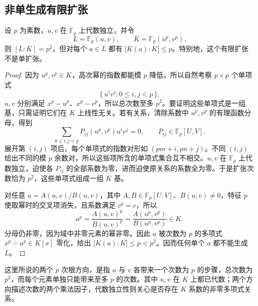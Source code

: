 \subsection{非单生成有限扩张}
\label{b1:subsec:1604:03}

\begin{proposition}\label{b1:prop:non-simple-finite-extension}
	设 \(p\) 为素数，\(u,v\) 在 \(\mathbb F_p\) 上代数独立，并令
	\[
		L=\mathbb F_p(u,v),\qquad K=\mathbb F_p(u^p,v^p).
	\]
	则 \([L:K]=p^2\)，但对每个 \(a\in L\) 都有 \(\bigl[K(a):K\bigr]\leq p\)。特别地，这个有限扩张不是单扩张。
\end{proposition}
\begin{proof}
	因为 \(u^p,v^p\in K\)，高次幂的指数都能模 \(p\) 降低，所以自然考察 \(p\times p\) 个单项式
	\[
		\{\,u^iv^j:0\le i,j<p\,\}.
	\]
	\(u,v\) 分别满足 \(x^p-u^p\)、\(x^p-v^p\)，所以总次数至多 \(p^2\)。要证明这些单项式是一组基，只需证明它们在 \(K\) 上线性无关。若有关系，清除系数中 \(u^p,v^p\) 的有理函数分母，得到
	\[
		\sum_{0\le i,j<p}P_{ij}(u^p,v^p)u^iv^j=0, \qquad P_{ij}\in\mathbb F_p[U,V].
	\]
	展开第 \((i,j)\) 项后，每个单项式的指数对形如 \((pm+i,pn+j)\)。不同 \((i,j)\) 给出不同的模 \(p\) 余数对，所以这些项所含的单项式集合互不相交。\(u,v\) 在 \(\mathbb F_p\) 上代数独立，迫使各 \(P_{ij}\) 的全部系数为零，进而迫使原关系的系数全为零。于是扩张次数恰为 \(p^2\)，这些单项式组成一组 \(K\) 基。

	对任意 \(a=A(u,v)/B(u,v)\)，其中 \(A,B\in\mathbb F_p[U,V]\)、\(B(u,v)\ne0\)，特征 \(p\) 使取幂时的交叉项消失，且系数满足 \(c^p=c\)，所以
	\[
		a^p=\frac{A(u,v)^p}{B(u,v)^p} =\frac{A(u^p,v^p)}{B(u^p,v^p)}\in K.
	\]
	分母仍非零，因为域中非零元素的幂非零。因此 \(a\) 被次数为 \(p\) 的多项式 \(x^p-a^p\in K[x]\) 零化，给出 \(\bigl[K(a):K\bigr]\leq p<p^2\)。因而任何单个 \(a\) 都不能生成 \(L\)。
\end{proof}
这里所说的两个 \(p\) 次根方向，是指 \(u\) 与 \(v\) 各带来一个次数为 \(p\) 的步骤，总次数为 \(p^2\)，而每个元素单独只能带来至多 \(p\) 的次数。其中 \(u,v\) 在 \(K\) 上都已代数；两个方向描述次数的两个乘法因子，代数独立性则关心是否存在 \(K\) 系数的非零多项式关系。
